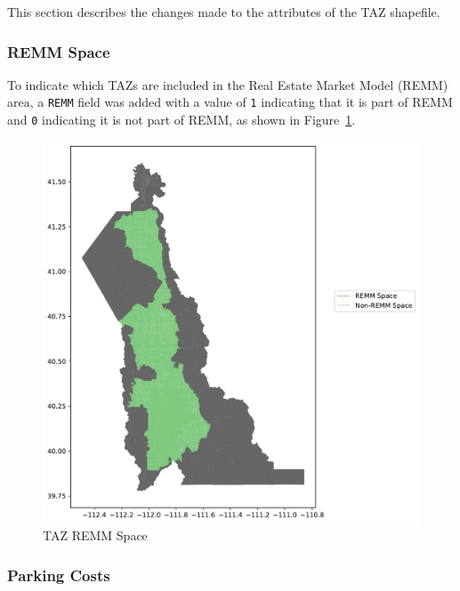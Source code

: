 \documentclass[
  letterpaper,
  DIV=11,
  numbers=noendperiod,
  titlepage=false]{scrreprt}
\begin{document}
This section describes the changes made to the attributes of the TAZ
shapefile.

\hypertarget{remm-space}{%
\subsubsection{REMM Space}\label{remm-space}}

To indicate which TAZs are included in the Real Estate Market Model
(REMM) area, a \texttt{REMM} field was added with a value of \texttt{1}
indicating that it is part of REMM and \texttt{0} indicating it is not
part of REMM, as shown in Figure~\ref{fig-taz-remm-space-pdf}.

\begin{figure}[H]

{\centering \includegraphics{v9x/v900/whats-new/2-inputdata_files/figure-pdf/fig-taz-remm-space-pdf-output-1.pdf}

}

\caption{\label{fig-taz-remm-space-pdf}TAZ REMM Space}

\end{figure}

\hypertarget{parking-costs}{%
\subsubsection{Parking Costs}\label{parking-costs}}
\end{document}
